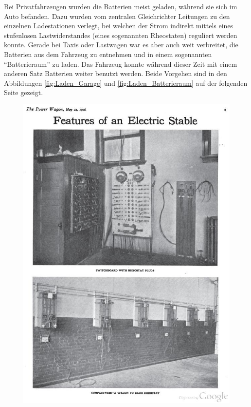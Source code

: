 Bei Privatfahrzeugen wurden die Batterien meist geladen, während sie sich im Auto befanden. Dazu wurden vom zentralen Gleichrichter Leitungen zu den einzelnen Ladestationen verlegt, bei welchen der Strom indirekt mittels eines stufenlosen Lastwiderstandes (eines sogenannten Rheostaten) reguliert werden konnte. Gerade bei Taxis oder Lastwagen war es aber auch weit verbreitet, die Batterien aus dem Fahrzeug zu entnehmen und in einem sogenannten "`Batterieraum"' zu laden. Das Fahrzeug konnte während dieser Zeit mit einem anderen Satz Batterien weiter benutzt werden. Beide Vorgehen sind in den Abbildungen \ref{fig:Laden_Garage} und \ref{fig:Laden_Batterieraum} auf der folgenden Seite gezeigt.

\begin{landscape}
\begin{figure}
\begin{minipage}{0.65\textwidth}
	\includegraphics[width=\textwidth]{images/Laden_Garage.jpg}

\end{minipage}
\end{figure}
\end{landscape}
